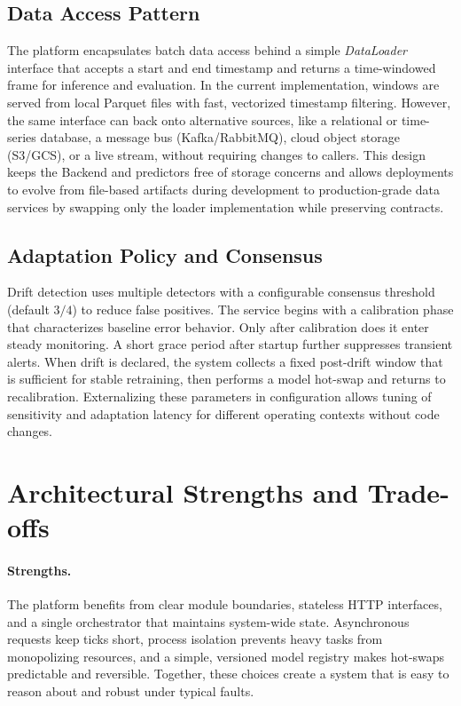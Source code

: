 \subsection{Data Access Pattern}
The platform encapsulates batch data access behind a simple \emph{DataLoader} interface that accepts a start and end timestamp and returns a time-windowed frame for inference and evaluation.
In the current implementation, windows are served from local Parquet files with fast, vectorized timestamp filtering.
However, the same interface can back onto alternative sources, like a relational or time-series database, a message bus (Kafka/RabbitMQ), cloud object storage (S3/GCS), or a live stream, without requiring changes to callers.
This design keeps the Backend and predictors free of storage concerns and allows deployments to evolve from file-based artifacts during development to production-grade data services by swapping only the loader implementation while preserving contracts.

\subsection{Adaptation Policy and Consensus}
Drift detection uses multiple detectors with a configurable consensus threshold (default $3/4$) to reduce false positives.
The service begins with a calibration phase that characterizes baseline error behavior.
Only after calibration does it enter steady monitoring.
A short grace period after startup further suppresses transient alerts.
When drift is declared, the system collects a fixed post-drift window that is sufficient for stable retraining, then performs a model hot-swap and returns to recalibration.
Externalizing these parameters in configuration allows tuning of sensitivity and adaptation latency for different operating contexts without code changes.

\section{Architectural Strengths and Trade-offs}
\paragraph{Strengths.} The platform benefits from clear module boundaries, stateless HTTP interfaces, and a single orchestrator that maintains system-wide state. Asynchronous requests keep ticks short, process isolation prevents heavy tasks from monopolizing resources, and a simple, versioned model registry makes hot-swaps predictable and reversible. Together, these choices create a system that is easy to reason about and robust under typical faults.

